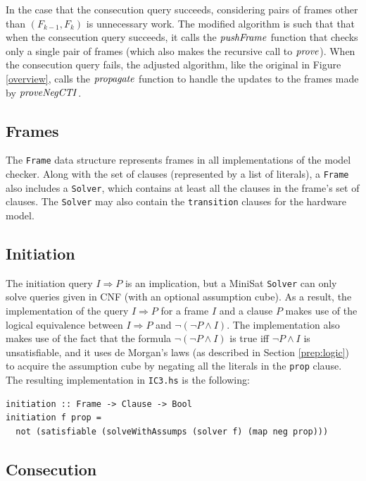 \documentclass[12pt,a4paper,twoside,openright]{report}
\begin{document}
{In the case that the consecution query succeeds, considering pairs of frames other
than $(F_{k - 1}, F_k)$ is unnecessary work. The modified algorithm is such that
that when the consecution query succeeds, it calls the ${\it pushFrame}$ function that
checks only a single pair of frames (which also makes the recursive call to ${\it prove}$).
When the consecution query fails, the adjusted algorithm, like the original in Figure \ref{overview},
calls the ${\it propagate}$ function to handle the updates to the frames made by ${\it proveNegCTI}$.

\subsection{Frames}
The \verb,Frame, data structure represents frames in all implementations of the model checker.
Along with the set of clauses (represented by a list of literals), a \verb,Frame, also includes
a \verb,Solver,, which contains at least all the clauses in the frame's set of clauses. The
\verb,Solver, may also contain the \verb,transition, clauses for the hardware model.

\subsection{Initiation}

The initiation query $I \Rightarrow P$ is an implication, but a MiniSat \verb,Solver, can only
solve queries given in CNF (with an optional assumption cube).
As a result, the implementation of the query $I \Rightarrow P$ for a frame $I$ and a
clause $P$ makes use of the logical equivalence between
$I \Rightarrow P$ and $\neg (\neg P \wedge I)$. The implementation
also makes use of the fact that the formula $\neg (\neg P \wedge I)$ is true
iff $\neg P \wedge I$ is unsatisfiable, and it uses de Morgan's laws (as described in
Section \ref{prep:logic}) to acquire the assumption cube by negating all the literals in
the \verb,prop, clause. The resulting implementation in \verb,IC3.hs, is the
following:

\begin{lstlisting}
initiation :: Frame -> Clause -> Bool
initiation f prop =
  not (satisfiable (solveWithAssumps (solver f) (map neg prop)))
\end{lstlisting}

\subsection{Consecution}

}
\end{document}
